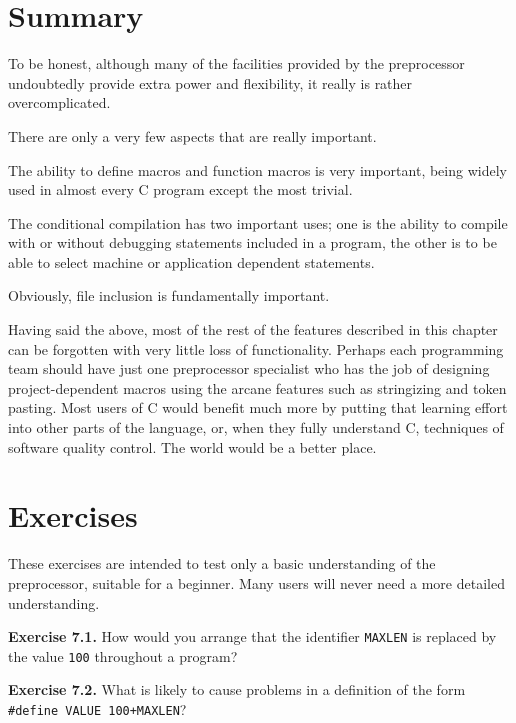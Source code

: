   

 
        \section{Summary}
        


  To be honest, although many of the facilities provided by the
   preprocessor undoubtedly provide extra power and flexibility, it
   really is rather overcomplicated.


  There are only a very few aspects that are really important.


  The ability to define macros and function macros is very important,
   being widely used in almost every C program except the most trivial.


  The conditional compilation has two important uses; one is the
   ability to compile with or without debugging statements included in
   a program, the other is to be able to select machine or application
   dependent statements.


  Obviously, file inclusion is fundamentally important.


  Having said the above, most of the rest of the features described in
   this chapter can be forgotten with very little loss of functionality.
   Perhaps each programming team should have just one preprocessor
   specialist who has the job of designing project-dependent macros using
   the arcane features such as stringizing and token pasting. Most users
   of C would benefit much more by putting that learning effort into other
   parts of the language, or, when they fully understand C, techniques of
   software quality control. The world would be a better place.


 
        \section{Exercises}
        


  These exercises are intended to test only a basic understanding of
   the preprocessor, suitable for a beginner. Many users will never
   need a more detailed understanding.


  \textbf{Exercise 7.1.} How would you arrange that the identifier
   \texttt{MAXLEN} is replaced by the value \texttt{100} throughout
   a program?


  \textbf{Exercise 7.2.} What is likely to cause problems in a definition of
   the form \texttt{\#define VALUE 100+MAXLEN}?


